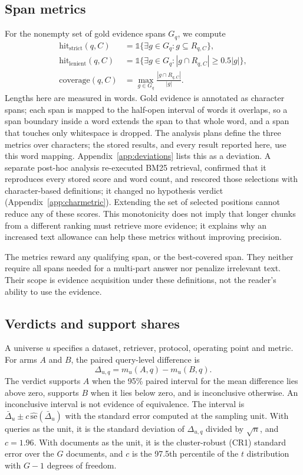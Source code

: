 \documentclass[11pt]{article}
\newcommand{\ind}{\mathbb{1}}
\begin{document}
\subsection{Span metrics}
For the nonempty set of gold evidence spans $G_q$, we compute
\begin{align}
\mathrm{hit}_{\mathrm{strict}}(q,C)&=\ind\{\exists g\in G_q:g\subseteq R_{q,C}\},\\
\mathrm{hit}_{\mathrm{lenient}}(q,C)&=\ind\{\exists g\in G_q:|g\cap R_{q,C}|\geq0.5|g|\},\\
\mathrm{coverage}(q,C)&=\max_{g\in G_q}\frac{|g\cap R_{q,C}|}{|g|}.
\label{eq:coverage}
\end{align}
Lengths here are measured in words. Gold evidence is annotated as character spans; each span is mapped to the half-open interval of words it overlaps, so a span boundary inside a word extends the span to that whole word, and a span that touches only whitespace is dropped. The analysis plans define the three metrics over characters; the stored results, and every result reported here, use this word mapping. Appendix~\ref{app:deviations} lists this as a deviation. A separate post-hoc analysis re-executed BM25 retrieval, confirmed that it reproduces every stored score and word count, and rescored those selections with character-based definitions; it changed no hypothesis verdict (Appendix~\ref{app:charmetric}). Extending the set of selected positions cannot reduce any of these scores. This monotonicity does not imply that longer chunks from a different ranking must retrieve more evidence; it explains why an increased text allowance can help these metrics without improving precision.

The metrics reward any qualifying span, or the best-covered span. They neither require all spans needed for a multi-part answer nor penalize irrelevant text. Their scope is evidence acquisition under these definitions, not the reader's ability to use the evidence.

\subsection{Verdicts and support shares}\label{sec:estimand}
A universe $u$ specifies a dataset, retriever, protocol, operating point and metric. For arms $A$ and $B$, the paired query-level difference is
\begin{equation}
\Delta_{u,q}=m_u(A,q)-m_u(B,q).
\end{equation}
The verdict supports $A$ when the 95\% paired interval for the mean difference lies above zero, supports $B$ when it lies below zero, and is inconclusive otherwise. An inconclusive interval is not evidence of equivalence. The interval is $\bar\Delta_u\pm c\,\widehat{\mathrm{se}}(\bar\Delta_u)$ with the standard error computed at the sampling unit. With queries as the unit, it is the standard deviation of $\Delta_{u,q}$ divided by $\sqrt n$, and $c=1.96$. With documents as the unit, it is the cluster-robust (CR1) standard error over the $G$ documents, and $c$ is the 97.5th percentile of the $t$ distribution with $G-1$ degrees of freedom.
\end{document}
